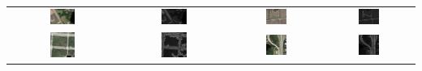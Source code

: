 \documentclass[12pt,a4paper]{article}
\begin{document}
\begin{tabular}{ c c c c}
 \includegraphics[width=0.25\textwidth]{./pictures/fimg2.jpg} & \includegraphics[width=0.25\textwidth]{./pictures/fimg2.jpg_final_img.jpg} & \includegraphics[width=0.25\textwidth]{./pictures/fimg3.png} & \includegraphics[width=0.25\textwidth]{./pictures/fimg3.png_final_img.jpg}\\
 \includegraphics[width=0.25\textwidth]{./pictures/fimg4.jpg} & \includegraphics[width=0.25\textwidth]{./pictures/fimg4.jpg_final_img.jpg} & \includegraphics[width=0.25\textwidth]{./pictures/fimg5.jpg} & \includegraphics[width=0.25\textwidth]{./pictures/fimg5.jpg_final_img.jpg}\\

\end{tabular}
\end{document}
